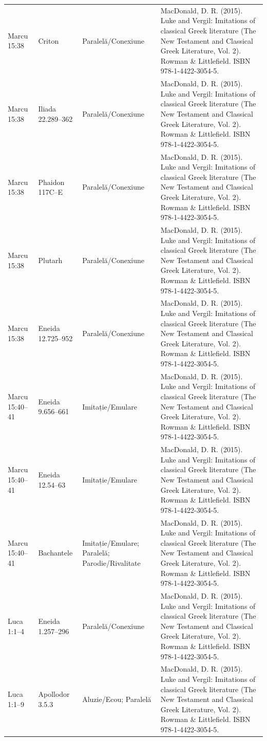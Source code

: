 \documentclass[12pt,a4paper,twoside,openany]{book}
\begin{document}
\begin{longtable}{L{1.4cm}L{1.7cm}L{3.1cm}L{8.4cm}}
Marcu 15:38 & Criton & Paralelă/Conexiune & MacDonald, D. R. (2015). Luke and Vergil: Imitations of classical Greek literature (The New Testament and Classical Greek Literature, Vol. 2). Rowman \& Littlefield. ISBN 978-1-4422-3054-5. \\
Marcu 15:38 & Iliada 22.289–362 & Paralelă/Conexiune & MacDonald, D. R. (2015). Luke and Vergil: Imitations of classical Greek literature (The New Testament and Classical Greek Literature, Vol. 2). Rowman \& Littlefield. ISBN 978-1-4422-3054-5. \\
Marcu 15:38 & Phaidon 117C–E & Paralelă/Conexiune & MacDonald, D. R. (2015). Luke and Vergil: Imitations of classical Greek literature (The New Testament and Classical Greek Literature, Vol. 2). Rowman \& Littlefield. ISBN 978-1-4422-3054-5. \\
Marcu 15:38 & Plutarh & Paralelă/Conexiune & MacDonald, D. R. (2015). Luke and Vergil: Imitations of classical Greek literature (The New Testament and Classical Greek Literature, Vol. 2). Rowman \& Littlefield. ISBN 978-1-4422-3054-5. \\
Marcu 15:38 & Eneida 12.725–952 & Paralelă/Conexiune & MacDonald, D. R. (2015). Luke and Vergil: Imitations of classical Greek literature (The New Testament and Classical Greek Literature, Vol. 2). Rowman \& Littlefield. ISBN 978-1-4422-3054-5. \\
Marcu 15:40–41 & Eneida 9.656–661 & Imitație/Emulare & MacDonald, D. R. (2015). Luke and Vergil: Imitations of classical Greek literature (The New Testament and Classical Greek Literature, Vol. 2). Rowman \& Littlefield. ISBN 978-1-4422-3054-5. \\
Marcu 15:40–41 & Eneida 12.54–63 & Imitație/Emulare & MacDonald, D. R. (2015). Luke and Vergil: Imitations of classical Greek literature (The New Testament and Classical Greek Literature, Vol. 2). Rowman \& Littlefield. ISBN 978-1-4422-3054-5. \\
Marcu 15:40–41 & Bachantele & Imitație/Emulare; Paralelă; Parodie/Rivalitate & MacDonald, D. R. (2015). Luke and Vergil: Imitations of classical Greek literature (The New Testament and Classical Greek Literature, Vol. 2). Rowman \& Littlefield. ISBN 978-1-4422-3054-5. \\
Luca 1:1–4 & Eneida 1.257–296 & Paralelă/Conexiune & MacDonald, D. R. (2015). Luke and Vergil: Imitations of classical Greek literature (The New Testament and Classical Greek Literature, Vol. 2). Rowman \& Littlefield. ISBN 978-1-4422-3054-5. \\
Luca 1:1–9 & Apollodor 3.5.3 & Aluzie/Ecou; Paralelă & MacDonald, D. R. (2015). Luke and Vergil: Imitations of classical Greek literature (The New Testament and Classical Greek Literature, Vol. 2). Rowman \& Littlefield. ISBN 978-1-4422-3054-5. \\

\end{longtable}
\end{document}
